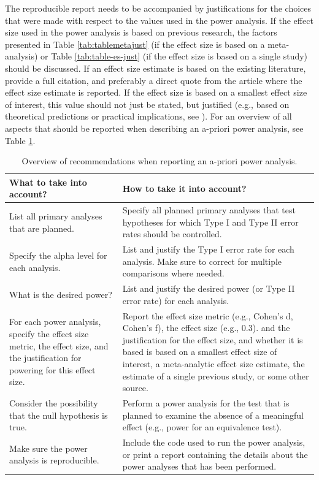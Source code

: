 \documentclass[
  oneside]{krantz}
\begin{document}
The reproducible report needs to be accompanied by justifications for the choices that were made with respect to the values used in the power analysis. If the effect size used in the power analysis is based on previous research, the factors presented in Table \ref{tab:tablemetajust} (if the effect size is based on a meta-analysis) or Table \ref{tab:table-es-just} (if the effect size is based on a single study) should be discussed. If an effect size estimate is based on the existing literature, provide a full citation, and preferably a direct quote from the article where the effect size estimate is reported. If the effect size is based on a smallest effect size of interest, this value should not just be stated, but justified (e.g., based on theoretical predictions or practical implications, see \citet{lakens_equivalence_2018}). For an overview of all aspects that should be reported when describing an a-priori power analysis, see Table \ref{tab:table-pow-rec-2}.

\begin{table}

\caption{\label{tab:table-pow-rec-2}Overview of recommendations when reporting an a-priori power analysis.}
\centering
\begin{tabular}[t]{>{\raggedright\arraybackslash}p{5cm}|>{\raggedright\arraybackslash}p{10cm}}
\hline
What to take into account? & How to take it into account?\\
\hline
List all primary analyses that are planned. & Specify all planned primary analyses that test hypotheses for which Type I and Type II error rates should be controlled.\\
\hline
Specify the alpha level for each analysis. & List and justify the Type I error rate for each analysis. Make sure to correct for multiple comparisons where needed.\\
\hline
What is the desired power? & List and justify the desired power (or Type II error rate) for each analysis.\\
\hline
For each power analysis, specify the effect size metric, the effect size, and the justification for powering for this effect size. & Report the effect size metric (e.g., Cohen's d, Cohen's f), the effect size (e.g., 0.3). and the justification for the effect size, and whether it is based is based on a smallest effect size of interest, a meta-analytic effect size estimate, the estimate of a single previous study, or some other source.\\
\hline
Consider the possibility that the null hypothesis is true. & Perform a power analysis for the test that is planned to examine the absence of a meaningful effect (e.g., power for an equivalence test).\\
\hline
Make sure the power analysis is reproducible. & Include the code used to run the power analysis, or print a report containing the details about the power analyses that has been performed.\\
\hline
\end{tabular}
\end{table}
\end{document}
